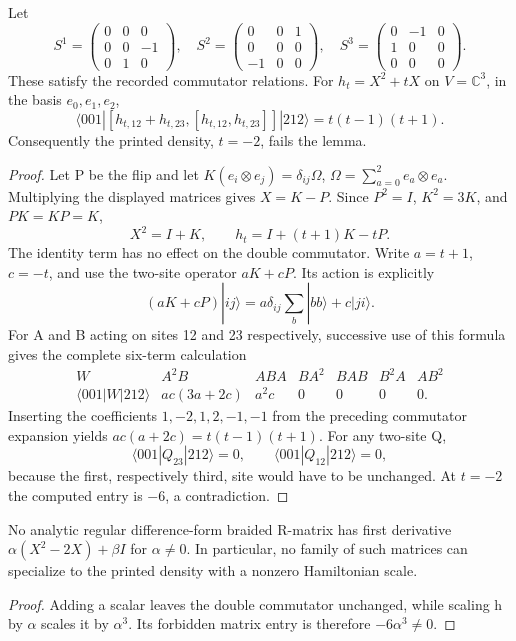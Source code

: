 \begin{proposition}\oursComputed{}
Let
\[
 S^1=\begin{pmatrix}0&0&0\\0&0&-1\\0&1&0\end{pmatrix},\quad
 S^2=\begin{pmatrix}0&0&1\\0&0&0\\-1&0&0\end{pmatrix},\quad
 S^3=\begin{pmatrix}0&-1&0\\1&0&0\\0&0&0\end{pmatrix}.
\]
These satisfy the recorded commutator relations. For
\(h_t=X^2+tX\) on \(V=\mathbb C^3\), in the basis
\(e_0,e_1,e_2\),
\[
 \langle001|[h_{t,12}+h_{t,23},[h_{t,12},h_{t,23}]]|212\rangle
 =t(t-1)(t+1).
\]
Consequently the printed density, \(t=-2\), fails the lemma.
\end{proposition}
\begin{proof}
Let P be the flip and let
\(K(e_i\otimes e_j)=\delta_{ij}\Omega\),
\(\Omega=\sum_{a=0}^2e_a\otimes e_a\).
Multiplying the displayed matrices gives \(X=K-P\).
Since \(P^2=I\), \(K^2=3K\), and \(PK=KP=K\),
\[
 X^2=I+K,\qquad h_t=I+(t+1)K-tP.
\]
The identity term has no effect on the double commutator. Write
\(a=t+1\), \(c=-t\), and use the two-site operator \(aK+cP\).
Its action is explicitly
\[
 (aK+cP)|ij\rangle=a\delta_{ij}\sum_b|bb\rangle+c|ji\rangle.
\]
For A and B acting on sites 12 and 23 respectively, successive use of
this formula gives the complete six-term calculation
\[
\begin{array}{c|rrrrrr}
 W&A^2B&ABA&BA^2&BAB&B^2A&AB^2\\\hline
 \langle001|W|212\rangle&ac(3a+2c)&a^2c&0&0&0&0.
\end{array}
\]
Inserting the coefficients \(1,-2,1,2,-1,-1\) from the preceding
commutator expansion yields \(ac(a+2c)=t(t-1)(t+1)\).
For any two-site Q,
\[
 \langle001|Q_{23}|212\rangle=0,
 \qquad \langle001|Q_{12}|212\rangle=0,
\]
because the first, respectively third, site would have to be unchanged.
At \(t=-2\) the computed entry is \(-6\), a contradiction.
\end{proof}

\begin{corollary}\ours{}
No analytic regular difference-form braided R-matrix has first derivative
\(\alpha(X^2-2X)+\beta I\) for \(\alpha\ne0\). In particular, no family
of such matrices can specialize to the printed density with a nonzero
Hamiltonian scale.
\end{corollary}
\begin{proof}
Adding a scalar leaves the double commutator unchanged, while scaling h
by \(\alpha\) scales it by \(\alpha^3\). Its forbidden matrix entry is
therefore \(-6\alpha^3\ne0\).
\end{proof}

